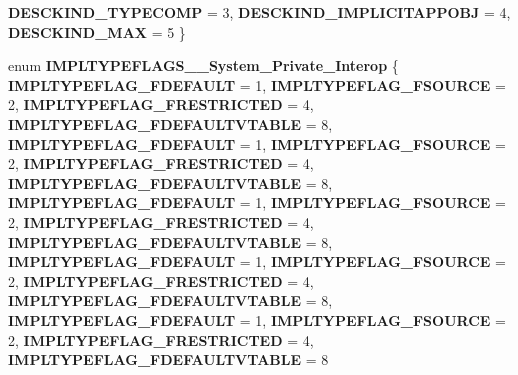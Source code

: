 \begin{DoxyCompactItemize}
{\bfseries D\+E\+S\+C\+K\+I\+N\+D\+\_\+\+T\+Y\+P\+E\+C\+O\+MP} = 3, 
\newline
{\bfseries D\+E\+S\+C\+K\+I\+N\+D\+\_\+\+I\+M\+P\+L\+I\+C\+I\+T\+A\+P\+P\+O\+BJ} = 4, 
{\bfseries D\+E\+S\+C\+K\+I\+N\+D\+\_\+\+M\+AX} = 5
 \}
\item 
\mbox{\label{namespace_system_1_1_runtime_1_1_interop_services_1_1_com_types_a1931ab75a38fde1eb6268b4b419ffec5}} 
enum {\bfseries I\+M\+P\+L\+T\+Y\+P\+E\+F\+L\+A\+G\+S\+\_\+\+\_\+\+System\+\_\+\+Private\+\_\+\+Interop} \{ \newline
{\bfseries I\+M\+P\+L\+T\+Y\+P\+E\+F\+L\+A\+G\+\_\+\+F\+D\+E\+F\+A\+U\+LT} = 1, 
{\bfseries I\+M\+P\+L\+T\+Y\+P\+E\+F\+L\+A\+G\+\_\+\+F\+S\+O\+U\+R\+CE} = 2, 
{\bfseries I\+M\+P\+L\+T\+Y\+P\+E\+F\+L\+A\+G\+\_\+\+F\+R\+E\+S\+T\+R\+I\+C\+T\+ED} = 4, 
{\bfseries I\+M\+P\+L\+T\+Y\+P\+E\+F\+L\+A\+G\+\_\+\+F\+D\+E\+F\+A\+U\+L\+T\+V\+T\+A\+B\+LE} = 8, 
\newline
{\bfseries I\+M\+P\+L\+T\+Y\+P\+E\+F\+L\+A\+G\+\_\+\+F\+D\+E\+F\+A\+U\+LT} = 1, 
{\bfseries I\+M\+P\+L\+T\+Y\+P\+E\+F\+L\+A\+G\+\_\+\+F\+S\+O\+U\+R\+CE} = 2, 
{\bfseries I\+M\+P\+L\+T\+Y\+P\+E\+F\+L\+A\+G\+\_\+\+F\+R\+E\+S\+T\+R\+I\+C\+T\+ED} = 4, 
{\bfseries I\+M\+P\+L\+T\+Y\+P\+E\+F\+L\+A\+G\+\_\+\+F\+D\+E\+F\+A\+U\+L\+T\+V\+T\+A\+B\+LE} = 8, 
\newline
{\bfseries I\+M\+P\+L\+T\+Y\+P\+E\+F\+L\+A\+G\+\_\+\+F\+D\+E\+F\+A\+U\+LT} = 1, 
{\bfseries I\+M\+P\+L\+T\+Y\+P\+E\+F\+L\+A\+G\+\_\+\+F\+S\+O\+U\+R\+CE} = 2, 
{\bfseries I\+M\+P\+L\+T\+Y\+P\+E\+F\+L\+A\+G\+\_\+\+F\+R\+E\+S\+T\+R\+I\+C\+T\+ED} = 4, 
{\bfseries I\+M\+P\+L\+T\+Y\+P\+E\+F\+L\+A\+G\+\_\+\+F\+D\+E\+F\+A\+U\+L\+T\+V\+T\+A\+B\+LE} = 8, 
\newline
{\bfseries I\+M\+P\+L\+T\+Y\+P\+E\+F\+L\+A\+G\+\_\+\+F\+D\+E\+F\+A\+U\+LT} = 1, 
{\bfseries I\+M\+P\+L\+T\+Y\+P\+E\+F\+L\+A\+G\+\_\+\+F\+S\+O\+U\+R\+CE} = 2, 
{\bfseries I\+M\+P\+L\+T\+Y\+P\+E\+F\+L\+A\+G\+\_\+\+F\+R\+E\+S\+T\+R\+I\+C\+T\+ED} = 4, 
{\bfseries I\+M\+P\+L\+T\+Y\+P\+E\+F\+L\+A\+G\+\_\+\+F\+D\+E\+F\+A\+U\+L\+T\+V\+T\+A\+B\+LE} = 8, 
\newline
{\bfseries I\+M\+P\+L\+T\+Y\+P\+E\+F\+L\+A\+G\+\_\+\+F\+D\+E\+F\+A\+U\+LT} = 1, 
{\bfseries I\+M\+P\+L\+T\+Y\+P\+E\+F\+L\+A\+G\+\_\+\+F\+S\+O\+U\+R\+CE} = 2, 
{\bfseries I\+M\+P\+L\+T\+Y\+P\+E\+F\+L\+A\+G\+\_\+\+F\+R\+E\+S\+T\+R\+I\+C\+T\+ED} = 4, 
{\bfseries I\+M\+P\+L\+T\+Y\+P\+E\+F\+L\+A\+G\+\_\+\+F\+D\+E\+F\+A\+U\+L\+T\+V\+T\+A\+B\+LE} = 8

\end{DoxyCompactItemize}
